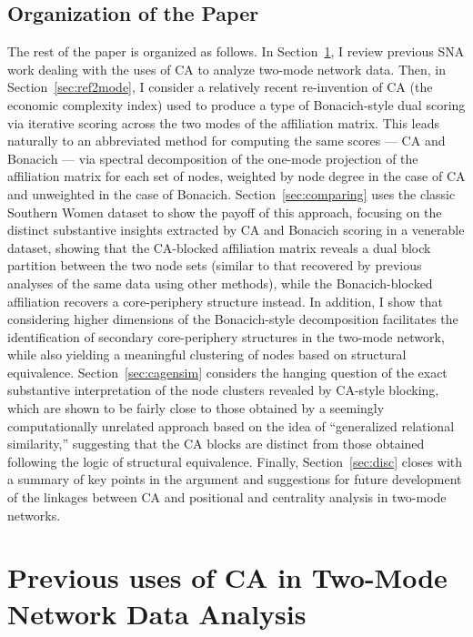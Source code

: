\documentclass[a4paper,fleqn]{cas-sc}
\begin{document}
\subsection{Organization of the Paper} \label{subsec:org}
The rest of the paper is organized as follows. In Section~\ref{sec:prevuses}, I review previous SNA work dealing with the uses of CA to analyze two-mode network data. Then, in Section~\ref{sec:ref2mode}, I consider a relatively recent re-invention of CA (the economic complexity index) used to produce a type of Bonacich-style dual scoring via iterative scoring across the two modes of the affiliation matrix. This leads naturally to an abbreviated method for computing the same scores — CA and Bonacich — via spectral decomposition of the one-mode projection of the affiliation matrix for each set of nodes, weighted by node degree in the case of CA and unweighted in the case of Bonacich. Section~\ref{sec:comparing} uses the classic Southern Women dataset to show the payoff of this approach, focusing on the distinct substantive insights extracted by CA and Bonacich scoring in a venerable dataset, showing that the CA-blocked affiliation matrix reveals a dual block partition between the two node sets (similar to that recovered by previous analyses of the same data using other methods), while the Bonacich-blocked affiliation recovers a core-periphery structure instead. In addition, I show that considering higher dimensions of the Bonacich-style decomposition facilitates the identification of secondary core-periphery structures in the two-mode network, while also yielding a meaningful clustering of nodes based on structural equivalence. Section~\ref{sec:cagensim} considers the hanging question of the exact substantive interpretation of the node clusters revealed by CA-style blocking, which are shown to be fairly close to those obtained by a seemingly computationally unrelated approach based on the idea of ``generalized relational similarity,'' suggesting that the CA blocks are distinct from those obtained following the logic of structural equivalence. Finally, Section~\ref{sec:disc} closes with a summary of key points in the argument and suggestions for future development of the linkages between CA and positional and centrality analysis in two-mode networks.  


\section{Previous uses of CA in Two-Mode Network Data Analysis} \label{sec:prevuses}
\end{document}
